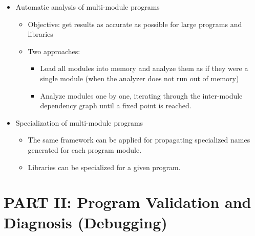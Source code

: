 \documentclass{article}
\renewcommand{\_}{\char'137}
\begin{document}
\begin{itemize}
\item Automatic analysis of multi-module programs
  \begin{itemize}
  \item Objective: get results as accurate as possible for large
    programs and libraries

  \item Two approaches: 
    \begin{itemize}
    \item Load all modules into memory and analyze them
      as if they were a single module (when the analyzer does not run
      out of memory)

    \item Analyze modules one by one, iterating through the
      inter-module dependency graph until a fixed point is reached. 
    \end{itemize}
  \end{itemize}

\item Specialization of multi-module programs
  \begin{itemize}
  \item The same framework can be applied for propagating specialized
    names generated for each program module.

  \item Libraries can be specialized for a given program.
  \end{itemize}
\end{itemize}

\newpage
\section{PART II: Program Validation and Diagnosis (Debugging)}
\end{document}
